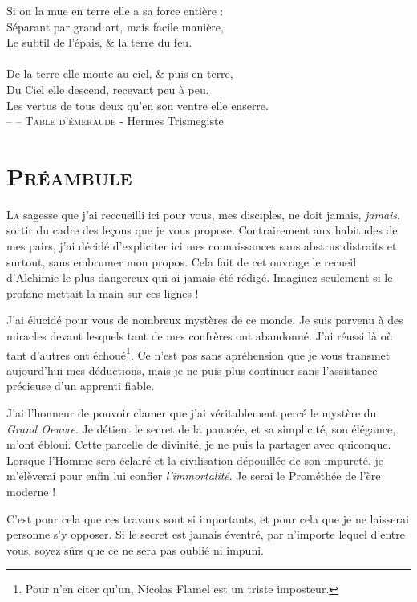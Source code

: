 \noindent
Si on la mue en terre elle a sa force entière :\\
Séparant par grand art, mais facile manière,\\
Le subtil de l'épais, \& la terre du feu.\\
\\
De la terre elle monte au ciel, \& puis en terre,\\
Du Ciel elle descend, recevant peu à peu,\\
Les vertus de tous deux qu'en son ventre elle enserre.\\

\small{-- -- \textsc{Table d'émeraude} - Hermes Trismegiste}

\newpage

\section{\textsc{Préambule}}

\lettrine{L}{a} sagesse que j'ai reccueilli ici pour vous, mes disciples, ne doit jamais,
\emph{jamais}, sortir du cadre des leçons que je vous propose.
Contrairement aux habitudes de mes pairs, j'ai décidé d'expliciter ici mes
connaissances sans abstrus distraits et surtout, sans embrumer mon
propos. Cela fait de cet ouvrage le recueil d'Alchimie le plus dangereux qui
ai jamais été rédigé. Imaginez seulement si le profane mettait la main sur ces
lignes !

J'ai élucidé pour vous de nombreux mystères de ce monde. Je suis parvenu à des
miracles devant lesquels tant de mes confrères ont abandonné. J'ai réussi là où
tant d'autres ont échoué\footnote{Pour n'en citer qu'un, Nicolas Flamel est un
triste imposteur.}. Ce n'est pas
sans apréhension que je vous transmet aujourd'hui mes déductions, mais je ne puis
plus continuer sans l'assistance précieuse d'un apprenti fiable.

J'ai l'honneur de pouvoir clamer que j'ai véritablement percé le mystère du
\emph{Grand Oeuvre}. Je détient le secret de la panacée, et sa simplicité, son
élégance, m'ont ébloui. Cette parcelle de divinité, je ne puis la partager avec
quiconque. Lorsque l'Homme sera éclairé et la civilisation dépouillée de son
impureté, je m'élèverai pour enfin lui confier \emph{l'immortalité}. Je serai
le Prométhée de l'ère moderne !

C'est pour cela que ces travaux sont si importants, et pour cela que je ne
laisserai personne s'y opposer. Si le secret est jamais éventré, par n'importe
lequel d'entre vous, soyez sûrs que ce ne sera pas oublié ni impuni.

